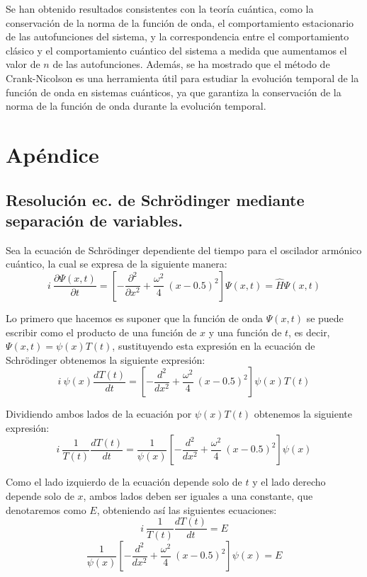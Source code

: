 \documentclass[10pt,onecolumn]{article}
\begin{document}
Se han obtenido resultados consistentes con la teoría cuántica, como la conservación de la norma de la función de onda, el comportamiento estacionario de las autofunciones del sistema, y la correspondencia entre el comportamiento clásico y el comportamiento cuántico del sistema a medida que aumentamos el valor de $n$ de las autofunciones. Además, se ha mostrado que el método de Crank-Nicolson es una herramienta útil para estudiar la evolución temporal de la función de onda en sistemas cuánticos, ya que garantiza la conservación de la norma de la función de onda durante la evolución temporal.

\section{Apéndice}
\subsection{Resolución ec. de Schrödinger mediante separación de variables.}
Sea la ecuación de Schrödinger dependiente del tiempo para el oscilador armónico cuántico, la cual se expresa de la siguiente manera:
\begin{equation}
    i\ \dfrac{\partial \Psi(x,t)}{\partial t} = [-\dfrac{\partial^2}{\partial x ^2} + \dfrac{\omega^2}{4}\ (x-0.5)^2]\Psi(x,t) = \hat{H} \Psi(x,t)
\end{equation}

Lo primero que hacemos es suponer que la función de onda $\Psi(x,t)$ se puede escribir como el producto de una función de $x$ y una función de $t$, es decir, $\Psi(x,t) = \psi(x) T(t)$, sustituyendo esta expresión en la ecuación de Schrödinger obtenemos la siguiente expresión:
\begin{equation}
    i\ \psi(x) \dfrac{d T(t)}{dt} = [-\dfrac{d^2}{dx ^2} + \dfrac{\omega^2}{4}\ (x-0.5)^2]\psi(x) T(t)
\end{equation}

Dividiendo ambos lados de la ecuación por $\psi(x) T(t)$ obtenemos la siguiente expresión:
\begin{equation}
    i\ \dfrac{1}{T(t)} \dfrac{d T(t)}{dt} = \dfrac{1}{\psi(x)} [-\dfrac{d^2}{dx ^2} + \dfrac{\omega^2}{4}\ (x-0.5)^2]\psi(x)
\end{equation}

Como el lado izquierdo de la ecuación depende solo de $t$ y el lado derecho depende solo de $x$, ambos lados deben ser iguales a una constante, que denotaremos como $E$, obteniendo así las siguientes ecuaciones:
\begin{equation}
    i\ \dfrac{1}{T(t)} \dfrac{d T(t)}{dt} = E
\end{equation}
\begin{equation}
    \dfrac{1}{\psi(x)} [-\dfrac{d^2}{dx ^2} + \dfrac{\omega^2}{4}\ (x-0.5)^2]\psi(x) = E
\end{equation}
\end{document}
